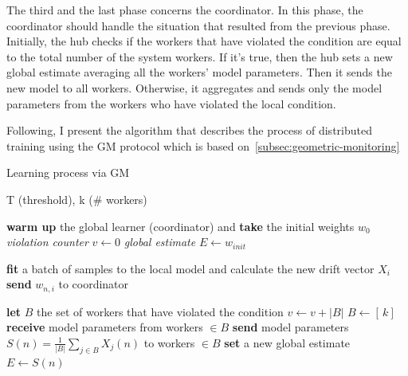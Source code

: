 The third and the last phase concerns the coordinator.
In this phase, the coordinator should handle the situation that resulted from the previous phase.
Initially, the hub checks if the workers that have violated the condition are equal to the total number of the system workers.
If it's true, then the hub sets a new global estimate averaging all the workers' model parameters.
Then it sends the new model to all workers.
Otherwise, it aggregates and sends only the model parameters from the workers who have violated the local condition.

\vspace{1cm}

Following, I present the algorithm that describes the process of distributed training using the GM protocol which is based on~\ref{subsec:geometric-monitoring}


\begin{algorithm}[H]
    \caption{Learning process via GM}
    \begin{algorithmic}[1]

        \vspace{0.05in}
        \REQUIRE T (threshold), k (\# workers)
        \vspace{0.05in}

        \vspace{-2.5ex}
        \STATE \textbf{warm up} the global learner (coordinator) and \textbf{take} the initial weights $w_0$
        \STATE \emph{violation counter} $v \leftarrow 0$
        \STATE \emph{global estimate} $E \leftarrow w_{init}$

        \vspace{-2.5ex}
        \STATE \textbf{fit} a batch of samples to the local model and calculate the new drift vector $X_i$
        \STATE \textbf{send} $w_{n,i}$ to coordinator 
        \ENDIF

        \vspace{-2.5ex}
        \STATE \textbf{let} $B$ the set of workers that have violated the condition
        \STATE $v \leftarrow v + |B|$
        \STATE $B \leftarrow [ \,k] \,$
        \ENDIF
        \STATE \textbf{receive} model parameters from workers $\in B$
        \ENDWHILE
        \STATE \textbf{send} model parameters $S(n) = \frac{1}{|B|} \sum_{j\in B}^{} X_j(n)$ to workers $\in B$
        \STATE \textbf{set} a new global estimate $E \leftarrow S(n)$
        \ENDIF

    \end{algorithmic}\label{alg:rnn_gm}
\end{algorithm}


